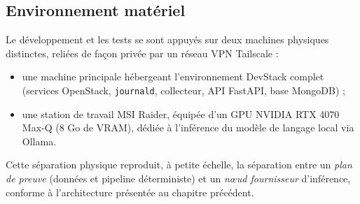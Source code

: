 \documentclass[a4paper,11pt,oneside]{report}
\begin{document}
\subsection{Environnement matériel}
Le développement et les tests se sont appuyés sur deux machines physiques distinctes, reliées de façon privée par un réseau VPN Tailscale :
\begin{itemize}
    \item une machine principale hébergeant l'environnement DevStack complet (services OpenStack, \texttt{journald}, collecteur, API FastAPI, base MongoDB) ;
    \item une station de travail MSI Raider, équipée d'un GPU NVIDIA RTX 4070 Max-Q (8 Go de VRAM), dédiée à l'inférence du modèle de langage local via Ollama.
\end{itemize}
Cette séparation physique reproduit, à petite échelle, la séparation entre un \emph{plan de preuve} (données et pipeline déterministe) et un \emph{nœud fournisseur} d'inférence, conforme à l'architecture présentée au chapitre précédent.
\end{document}
